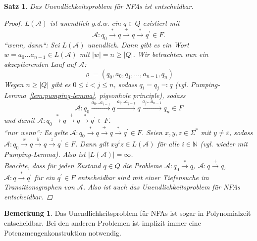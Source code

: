 \documentclass[11pt, a4paper]{article}
\theoremstyle{definition}
\newtheorem*{remark*}{Bemerkung}
\theoremstyle{plain}
\newtheorem{theorem}[definition]{Satz}
\numberwithin{equation}{section}
\newcommand{\reaches}{\xrightarrow}
\begin{document}
\begin{theorem}\label{thm:nfa_infinity}
	Das Unendlichkeitsproblem für NFAs ist entscheidbar.
	\begin{proof}
		$L(\mathcal{A})$ ist unendlich g.d.w. ein $q \in Q$ existiert mit 
		$$
			\mathcal{A}: q_0 \reaches{\ast} q \reaches{+} q \reaches{\ast} q^\prime \in F.
		$$
		``wenn, dann``: Sei $L(\mathcal{A})$ unendlich. Dann gibt es ein Wort $w = a_0 \ldots a_{n-1} \in L(\mathcal{A})$ mit $|w| = n \geq |Q|$. Wir betrachten nun ein akzeptierenden Lauf auf $\mathcal{A}$:
		$$
			\varrho = (q_0, a_0, q_1, \ldots, a_{n-1}, q_n)
		$$
		Wegen $n \geq |Q|$ gibt es $0 \leq i < j \leq n$, sodass $q_i = q_j \eqqcolon q$ (vgl. Pumping-Lemma~\ref{lem:pumping-lemma}, pigeonhole principle), sodass
		$$
			\mathcal{A}: q_0 \reaches{a_0 \ldots a_{i-1}} q \reaches{a_i \ldots a_{j-1}} q \reaches{a_j \ldots a_{n-1}} q_n \in F
		$$
		und damit $\mathcal{A}: q_0 \reaches{\ast} q \reaches{+} q \reaches{\ast} q^\prime \in F$.\\
		``nur wenn``: Es gelte $\mathcal{A}: q_0 \reaches{\ast} q \reaches{+} q \reaches{\ast} q^\prime \in F$. Seien $x, y, z \in \Sigma^\ast$ mit $y \neq \varepsilon$, sodass $\mathcal{A}: q_0 \reaches{x} q \reaches{y} q \reaches{z} q^\prime \in F$. Dann gilt $xy^iz \in L(\mathcal{A})$ für alle $i \in \mathbb{N}$ (vgl. wieder mit Pumping-Lemma). Also ist $|L(\mathcal{A})| = \infty$.\\
		Beachte, dass für jeden Zustand $q \in Q$ die Probleme $\mathcal{A}: q_0 \reaches{\ast} q$, $\mathcal{A}: q \reaches{+} q$, $\mathcal{A}: q \reaches{\ast} q^\prime$ für ein $q^\prime \in F$ entscheidbar sind mit einer Tiefensuche im Transitionsgraphen von $\mathcal{A}$. Also ist auch das Unendlichkeitsproblem für NFAs entscheidbar.
	\end{proof}
\end{theorem}
\begin{remark*}
	Das Unendlichkeitsproblem für NFAs ist sogar in Polynomialzeit entscheidbar. Bei den anderen Problemen ist implizit immer eine Potenzmengenkonstruktion notwendig.
\end{remark*}
\end{document}
